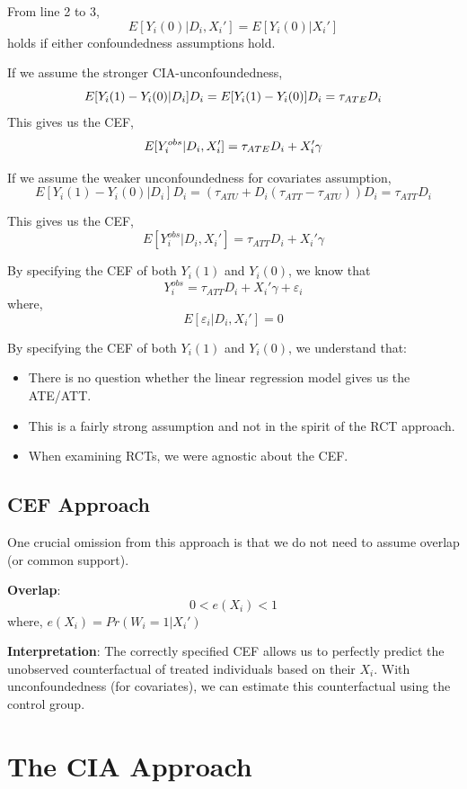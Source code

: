\documentclass[
  letterpaper,
  DIV=11,
  numbers=noendperiod]{scrreprt}
\providecommand{\tightlist}{%
  \setlength{\itemsep}{0pt}\setlength{\parskip}{0pt}}\usepackage{longtable,booktabs,array}
\theoremstyle{definition}
\theoremstyle{remark}
\begin{document}
From line 2 to 3, \[
E[Y_i(0)|D_i,X_i'] = E[Y_i(0)|X_i']
\] holds if either confoundedness assumptions hold.

If we assume the stronger CIA-unconfoundedness, \[
E[Y_i(1)-Y_i(0)|D_i]D_i = E[Y_i(1)-Y_i(0)]D_i = \tau_{\scriptsize{ATE}}D_i
\] This gives us the CEF, \[
E[Y^{obs}_i|D_i,X_i'] = \tau_{\scriptsize{ATE}}D_i + X_i'\gamma
\]

If we assume the weaker unconfoundedness for covariates assumption, \[
E[Y_i(1)-Y_i(0)|D_i]D_i = \left(\tau_{ATU} + D_i(\tau_{ATT}-\tau_{ATU})\right)D_i = \tau_{ATT}D_i
\]

This gives us the CEF, \[
E[Y^{obs}_i|D_i,X_i'] = \tau_{ATT}D_i + X_i'\gamma
\]

By specifying the CEF of both \(Y_i(1)\) and \(Y_i(0)\), we know that \[
Y^{obs}_i = \tau_{ATT}D_i + X_i'\gamma + \varepsilon_i
\] where, \[
E[\varepsilon_i|D_i,X_i'] = 0
\]

By specifying the CEF of both \(Y_i(1)\) and \(Y_i(0)\), we understand
that:

\begin{itemize}
\tightlist
\item
  There is no question whether the linear regression model gives us the
  ATE/ATT.
\item
  This is a fairly strong assumption and not in the spirit of the RCT
  approach.
\item
  When examining RCTs, we were agnostic about the CEF.
\end{itemize}

\section{CEF Approach}\label{cef-approach-2}

One crucial omission from this approach is that we do not need to assume
overlap (or common support).

\textbf{Overlap}: \[
0 < e(X_i) < 1
\] where, \(e(X_i) = Pr(W_i=1|X_i')\)

\textbf{Interpretation}: The correctly specified CEF allows us to
perfectly predict the unobserved counterfactual of treated individuals
based on their \(X_i\). With unconfoundedness (for covariates), we can
estimate this counterfactual using the control group.

\chapter{The CIA Approach}\label{the-cia-approach}
\end{document}
